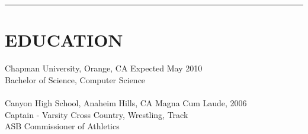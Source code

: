 \documentclass{res}
\begin{document}
 


\address{5205 E. Rolling Hill Drive\\Anaheim, CA 92807\\(714)209-2092}

\address{smith237@mail.chapman.edu\\yasumoto7@gmail.com\\joe@joemsmith.com}

\begin{resume}

\rule{\textwidth}{1pt}

\section{EDUCATION}          
	 Chapman University, Orange, CA \hspace{2.0in} Expected May 2010\\
	 Bachelor of Science, Computer Science \\
	 \\
	 Canyon High School, Anaheim Hills, CA \hspace{2.0in} Magna Cum Laude, 2006\\
	 Captain - Varsity Cross Country, Wrestling, Track\\
	 ASB Commissioner of Athletics


\end{resume}
\end{document}
